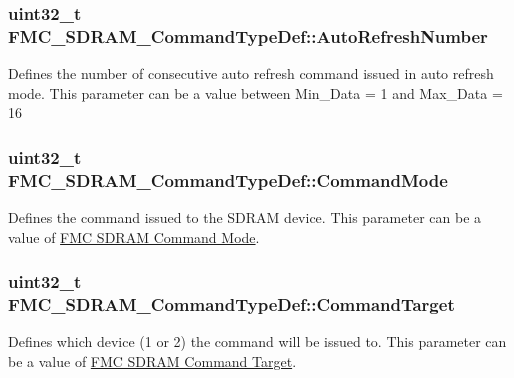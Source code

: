 \subsubsection[{\texorpdfstring{Auto\+Refresh\+Number}{AutoRefreshNumber}}]{\setlength{\rightskip}{0pt plus 5cm}uint32\+\_\+t F\+M\+C\+\_\+\+S\+D\+R\+A\+M\+\_\+\+Command\+Type\+Def\+::\+Auto\+Refresh\+Number}\hypertarget{struct_f_m_c___s_d_r_a_m___command_type_def_a22efd0147d0fa1372592aae8d4c2d037}{}\label{struct_f_m_c___s_d_r_a_m___command_type_def_a22efd0147d0fa1372592aae8d4c2d037}
Defines the number of consecutive auto refresh command issued in auto refresh mode. This parameter can be a value between Min\+\_\+\+Data = 1 and Max\+\_\+\+Data = 16 
\subsubsection[{\texorpdfstring{Command\+Mode}{CommandMode}}]{\setlength{\rightskip}{0pt plus 5cm}uint32\+\_\+t F\+M\+C\+\_\+\+S\+D\+R\+A\+M\+\_\+\+Command\+Type\+Def\+::\+Command\+Mode}\hypertarget{struct_f_m_c___s_d_r_a_m___command_type_def_acce198aed22a4a6ee69abc568393a728}{}\label{struct_f_m_c___s_d_r_a_m___command_type_def_acce198aed22a4a6ee69abc568393a728}
Defines the command issued to the S\+D\+R\+AM device. This parameter can be a value of \hyperlink{group___f_m_c___s_d_r_a_m___command___mode}{F\+MC S\+D\+R\+AM Command Mode}. 
\subsubsection[{\texorpdfstring{Command\+Target}{CommandTarget}}]{\setlength{\rightskip}{0pt plus 5cm}uint32\+\_\+t F\+M\+C\+\_\+\+S\+D\+R\+A\+M\+\_\+\+Command\+Type\+Def\+::\+Command\+Target}\hypertarget{struct_f_m_c___s_d_r_a_m___command_type_def_a1b77fbf8ef17e12284c64f174ed736de}{}\label{struct_f_m_c___s_d_r_a_m___command_type_def_a1b77fbf8ef17e12284c64f174ed736de}
Defines which device (1 or 2) the command will be issued to. This parameter can be a value of \hyperlink{group___f_m_c___s_d_r_a_m___command___target}{F\+MC S\+D\+R\+AM Command Target}. 
